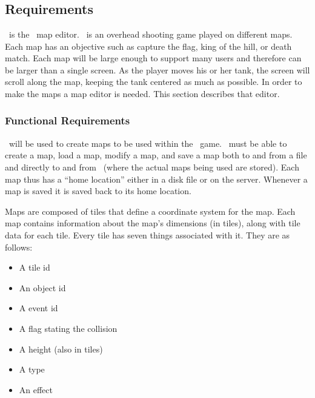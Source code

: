 %

\chapter{\MapEditor}
\label{mapeditor}

\section{Requirements}

\MapEditor\ is the \VTank\ map editor. \VTank\ is an overhead shooting game played on different maps. Each map has an objective such as capture the flag, king of the hill, or death match. Each map will be large enough to support many users and therefore can be larger than a single screen. As the player moves his or her tank, the screen will scroll along the map, keeping the tank centered as much as possible. In order to make the maps a map editor is needed. This section describes that editor.

\subsection{Functional Requirements}

\MapEditor\ will be used to create maps to be used within the \VTank\ game. \MapEditor\ must be able to create a map, load a map, modify a map, and save a map both to and from  a  file and directly to and from \MainServer\ (where the actual maps being used are stored). Each map thus has a ``home location'' either in a disk file or on the server. Whenever a map is saved it is saved back to its home location.

Maps are composed of tiles that define a coordinate system for the map. Each map contains information about the map's dimensions (in tiles), along with tile data for each tile. Every tile has seven things associated with it. They are as follows:
\newpage
\begin{itemize}
\item A tile id
\item An object id
\item A event id
\item A flag stating the collision
\item A height (also in tiles)
\item A type 
\item An effect 
\end{itemize}

